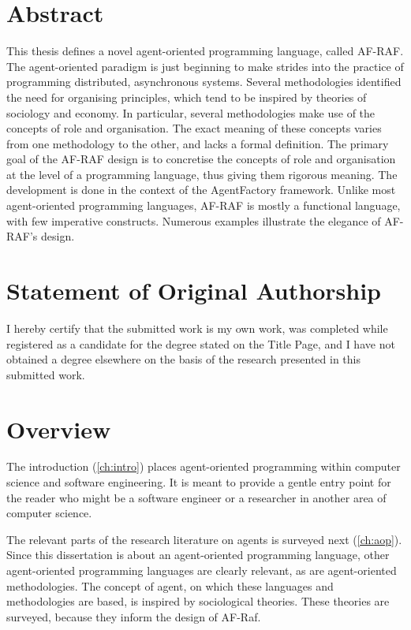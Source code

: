 \documentclass[a4paper,12pt,oneside,fleqn]{book} %
\newcommand{\rg}[1]{\marginpar{\tiny\raggedright\textcolor{blue}{\bf rg:} #1}}
\renewcommand{\rg}{}
\begin{document}
\chapter*{Abstract} %

This thesis defines a novel agent-oriented programming language, called
AF-RAF\null.  The agent-oriented paradigm is just beginning to make strides
into the practice of programming distributed, asynchronous systems.
Several methodologies identified the need for organising principles, which
tend to be inspired by theories of sociology and economy.  In particular,
several methodologies make use of the concepts of role and organisation.
The exact meaning of these concepts varies from one methodology to the
other, and lacks a formal definition.  The primary goal of the AF-RAF
design is to concretise the concepts of role and organisation at the level
of a programming language, thus giving them rigorous meaning. The
development is done in the context of the AgentFactory framework.  Unlike
most agent-oriented programming languages, AF-RAF is mostly a functional
language, with few imperative constructs.  Numerous examples illustrate the
elegance of AF-RAF's design.


\chapter*{Statement of Original Authorship} %

I hereby certify that the submitted work is my own work, was completed
while registered as a candidate for the degree stated on the Title Page,
and I have not obtained a degree elsewhere on the basis of the research
presented in this submitted work.



\chapter*{Overview} %

The introduction (\autoref{ch:intro}) places agent-oriented programming
within computer science and software engineering. It is meant to provide a
gentle entry point for the reader who might be a software engineer or a
researcher in another area of computer science.

The relevant parts of the research literature on agents is surveyed next
(\autoref{ch:aop}). Since this dissertation is about an agent-oriented
programming language, other agent-oriented programming languages are
clearly relevant, as are agent-oriented methodologies. The concept of
agent, on which these languages and methodologies are based, is inspired by
sociological theories. These theories are surveyed, because they inform the
design of AF-Raf.
\end{document}
